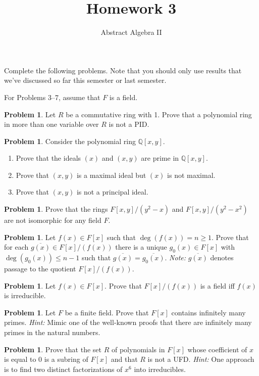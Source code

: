 \documentclass[11pt]{scrartcl}
\theoremstyle{definition}
\newtheorem{problem}[theorem]{Problem}
\newcommand{\blankline}{\pagebreak[2]\vspace{.5\baselineskip}}
\begin{document}
\title{Homework 3}
\subtitle{Abstract Algebra II}
\date{}

\maketitle
\thispagestyle{fancy}

Complete the following problems. Note that you should only use results that we've discussed so far this semester or last semester.

\blankline

For Problems 3--7, assume that $F$ is a field.

\begin{problem}
Let $R$ be a commutative ring with 1.  Prove that a polynomial ring in more than one variable over $R$ is not a PID.
\end{problem}

\begin{problem}
Consider the polynomial ring $\mathbb{Q}[x,y]$.
\begin{enumerate}[label=\rm{(\alph*)}]
\item Prove that the ideals $(x)$ and $(x,y)$ are prime in $\mathbb{Q}[x,y]$.
\item Prove that $(x,y)$ is a maximal ideal but $(x)$ is not maximal.
\item Prove that $(x,y)$ is not a principal ideal.
\end{enumerate}
\end{problem}

\begin{problem}
Prove that the rings $F[x,y]/(y^2-x)$ and $F[x,y]/(y^2-x^2)$ are not isomorphic for any field $F$.
\end{problem}

\begin{problem}
Let $f(x)\in F[x]$ such that $\deg(f(x))=n\geq 1$.  Prove that for each $\overline{g(x)}\in F[x]/(f(x))$ there is a unique $g_0(x)\in F[x]$ with $\deg(g_0(x))\leq n-1$ such that $\overline{g(x)}=\overline{g_0(x)}$. \emph{Note:} $\overline{g(x)}$ denotes passage to the quotient $F[x]/(f(x))$.
\end{problem}

\begin{problem}
Let $f(x)\in F[x]$.  Prove that $F[x]/(f(x))$ is a field iff $f(x)$ is irreducible.
\end{problem}

\begin{problem}
Let $F$ be a finite field.  Prove that $F[x]$ contains infinitely many primes. \emph{Hint:} Mimic one of the well-known proofs that there are infinitely many primes in the natural numbers.  
\end{problem}

\begin{problem}
Prove that the set $R$ of polynomials in $F[x]$ whose coefficient of $x$ is equal to 0 is a subring of $F[x]$ and that $R$ is not a UFD.  \emph{Hint:} One approach is to find two distinct factorizations of $x^6$ into irreducibles.
\end{problem}
\end{document}
